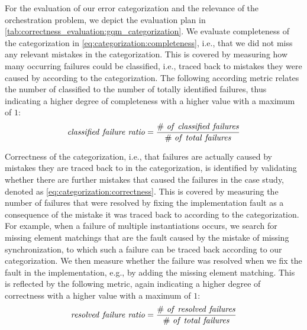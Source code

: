 For the evaluation of our error categorization and the relevance of the orchestration problem, we depict the evaluation plan in \autoref{tab:correctness_evaluation:gqm_categorization}.
We evaluate completeness of the categorization in \autoref{eq:categorization:completeness}, i.e., that we did not miss any relevant mistakes in the categorization. 
This is covered by measuring how many occurring failures could be classified, i.e., traced back to mistakes they were caused by according to the categorization.
The following according metric relates the number of classified to the number of totally identified failures, thus indicating a higher degree of completeness with a higher value with a maximum of $1$:
\begin{align*}
    \mathvariable{classified\ failure\ ratio} = \frac{\mathvariable{\#\ of\ classified\ failures}}{\mathvariable{\#\ of\ total\ failures}}
\end{align*}

Correctness of the categorization, i.e., that failures are actually caused by mistakes they are traced back to in the categorization, is identified by validating whether there are further mistakes that caused the failures in the case study, denoted as \autoref{eq:categorization:correctness}.
This is covered by measuring the number of failures that were resolved by fixing the implementation fault as a consequence of the mistake it was traced back to according to the categorization.
For example, when a failure of multiple instantiations occurs, we search for missing element matchings that are the fault caused by the mistake of missing synchronization, to which such a failure can be traced back according to our categorization.
We then measure whether the failure was resolved when we fix the fault in the implementation, e.g., by adding the missing element matching.
This is reflected by the following metric, again indicating a higher degree of correctness with a higher value with a maximum of $1$:
\begin{align*}
    \mathvariable{resolved\ failure\ ratio} = \frac{\mathvariable{\#\ of\ resolved\ failures}}{\mathvariable{\#\ of\ total\ failures}}
\end{align*}


